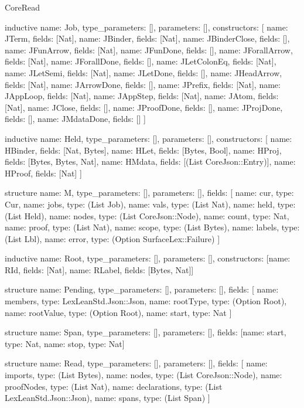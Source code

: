 \begin{lexlean}{CoreRead}
\begin{semanticmodule}
inductive{
  name: Job,
  type_parameters: [],
  parameters: [],
  constructors: [
    {name: JTerm, fields: [Nat]},
    {name: JBinder, fields: [Nat]},
    {name: JBinderClose, fields: []},
    {name: JFunArrow, fields: [Nat]},
    {name: JFunDone, fields: []},
    {name: JForallArrow, fields: [Nat]},
    {name: JForallDone, fields: []},
    {name: JLetColonEq, fields: [Nat]},
    {name: JLetSemi, fields: [Nat]},
    {name: JLetDone, fields: []},
    {name: JHeadArrow, fields: [Nat]},
    {name: JArrowDone, fields: []},
    {name: JPrefix, fields: [Nat]},
    {name: JAppLoop, fields: [Nat]},
    {name: JAppStep, fields: [Nat]},
    {name: JAtom, fields: [Nat]},
    {name: JClose, fields: []},
    {name: JProofDone, fields: []},
    {name: JProjDone, fields: []},
    {name: JMdataDone, fields: []}
  ]
}

inductive{
  name: Held,
  type_parameters: [],
  parameters: [],
  constructors: [
    {name: HBinder, fields: [Nat, Bytes]},
    {name: HLet, fields: [Bytes, Bool]},
    {name: HProj, fields: [Bytes, Bytes, Nat]},
    {name: HMdata, fields: [(List CoreJson::Entry)]},
    {name: HProof, fields: [Nat]}
  ]
}

structure{
  name: M,
  type_parameters: [],
  parameters: [],
  fields: [
    {name: cur, type: Cur},
    {name: jobs, type: (List Job)},
    {name: vals, type: (List Nat)},
    {name: held, type: (List Held)},
    {name: nodes, type: (List CoreJson::Node)},
    {name: count, type: Nat},
    {name: proof, type: (List Nat)},
    {name: scope, type: (List Bytes)},
    {name: labels, type: (List Lbl)},
    {name: error, type: (Option SurfaceLex::Failure)}
  ]
}

inductive{
  name: Root,
  type_parameters: [],
  parameters: [],
  constructors: [{name: RId, fields: [Nat]}, {name: RLabel, fields: [Bytes, Nat]}]
}

structure{
  name: Pending,
  type_parameters: [],
  parameters: [],
  fields: [
    {name: members, type: LexLeanStd.Json::Json},
    {name: rootType, type: (Option Root)},
    {name: rootValue, type: (Option Root)},
    {name: start, type: Nat}
  ]
}

structure{
  name: Span,
  type_parameters: [],
  parameters: [],
  fields: [{name: start, type: Nat}, {name: stop, type: Nat}]
}

structure{
  name: Read,
  type_parameters: [],
  parameters: [],
  fields: [
    {name: imports, type: (List Bytes)},
    {name: nodes, type: (List CoreJson::Node)},
    {name: proofNodes, type: (List Nat)},
    {name: declarations, type: (List LexLeanStd.Json::Json)},
    {name: spans, type: (List Span)}
  ]
}


\end{semanticmodule}
\end{lexlean}

